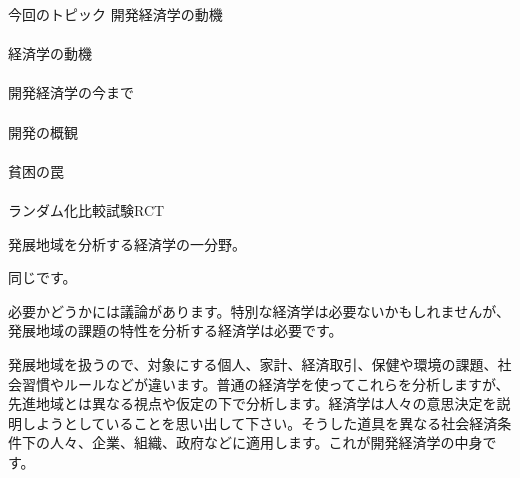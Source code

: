 \begin{frame}[t]{今回のトピック}
開発経済学の動機\\~\\
経済学の動機\\~\\
開発経済学の今まで\\~\\
開発の概観\\~\\
貧困の罠\\~\\
ランダム化比較試験RCT
\end{frame}

\begin{frame}{}
\begin{description}
\setlength{\itemsep}{3.0ex}\setlength{\baselineskip}{12pt}
\item[開発経済学とは?] \DescPause 発展地域を分析する経済学の一分野。
\pause
\item[クラスで習う普通の経済学と違うものですか?]\DescPause 同じです。 
\pause
\item[では、なぜ開発経済学が必要なのですか?] \DescPause
必要かどうかには議論があります。特別な経済学は必要ないかもしれませんが、発展地域の課題の特性を分析する経済学は必要です。
\pause
\item[開発経済学と普通の経済学に違いがあるとすれば何ですか?] \DescPause
発展地域を扱うので、対象にする個人、家計、経済取引、保健や環境の課題、社会習慣やルールなどが違います。普通の経済学を使ってこれらを分析しますが、先進地域とは異なる視点や仮定の下で分析します。経済学は人々の意思決定を説明しようとしていることを思い出して下さい。そうした道具を異なる社会経済条件下の人々、企業、組織、政府などに適用します。これが開発経済学の中身です。
\end{description}
\end{frame}
